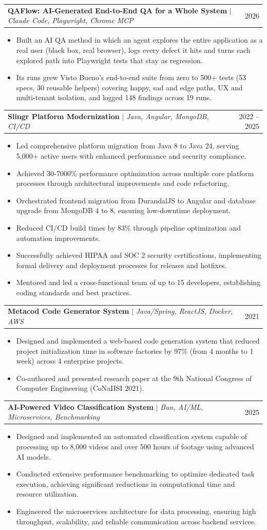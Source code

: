 \documentclass[letterpaper,11pt]{article}
\makeatletter
\newcommand{\resumeItem}[1]{
  \item\small{
    {#1 \vspace{-1pt}}
  }
}
\newcommand{\resumeProjectHeading}[2]{
    \item
    \begin{tabular*}{0.97\textwidth}{l@{\extracolsep{\fill}}r}
      \small#1 & #2 \\
    \end{tabular*}\vspace{-5pt}
}
\newcommand{\resumeItemListStart}{\begin{itemize}}
\newcommand{\resumeItemListEnd}{\end{itemize}\vspace{-3pt}}
\makeatother
\begin{document}
  \resumeProjectHeading
    {\textbf{QAFlow: AI-Generated End-to-End QA for a Whole System} $|$ \emph{Claude Code, Playwright, Chrome MCP}}{2026}
    \resumeItemListStart
      \resumeItem{Built an AI QA method in which an agent explores the entire application as a real user (black box, real browser), logs every defect it hits and turns each explored path into Playwright tests that stay as regression.}
      \resumeItem{Its runs grew Visto Bueno's end-to-end suite from zero to 500+ tests (53 specs, 30 reusable helpers) covering happy, sad and edge paths, UX and multi-tenant isolation, and logged 148 findings across 19 runs.}
    \resumeItemListEnd

  \resumeProjectHeading
    {\textbf{Slingr Platform Modernization} $|$ \emph{Java, Angular, MongoDB, CI/CD}}{2022 -- 2025}
    \resumeItemListStart
      \resumeItem{Led comprehensive platform migration from Java 8 to Java 24, serving 5,000+ active users with enhanced performance and security compliance.}
      \resumeItem{Achieved 30-7000\% performance optimization across multiple core platform processes through architectural improvements and code refactoring.}
      \resumeItem{Orchestrated frontend migration from DurandalJS to Angular and database upgrade from MongoDB 4 to 8, ensuring low-downtime deployment.}
      \resumeItem{Reduced CI/CD build times by 83\% through pipeline optimization and automation improvements.}
      \resumeItem{Successfully achieved HIPAA and SOC 2 security certifications, implementing formal delivery and deployment processes for releases and hotfixes.}
      \resumeItem{Mentored and led a cross-functional team of up to 15 developers, establishing coding standards and best practices.}
    \resumeItemListEnd

  \resumeProjectHeading
    {\textbf{Metacod Code Generator System} $|$ \emph{Java/Spring, ReactJS, Docker, AWS}}{2021}
    \resumeItemListStart
      \resumeItem{Designed and implemented a web-based code generation system that reduced project initialization time in software factories by 97\% (from 4 months to 1 week) across 4 enterprise projects.}
      \resumeItem{Co-authored and presented research paper at the 9th National Congress of Computer Engineering (CoNaIISI 2021).}
    \resumeItemListEnd

    \resumeProjectHeading
    {\textbf{AI-Powered Video Classification System} $|$ \emph{Bun, AI/ML, Microservices, Benchmarking}}{2025}
    \resumeItemListStart
      \resumeItem{Designed and implemented an automated classification system capable of processing up to 8,000 videos and over 500 hours of footage using advanced AI models.}
      \resumeItem{Conducted extensive performance benchmarking to optimize dedicated task execution, achieving significant reductions in computational time and resource utilization.}
      \resumeItem{Engineered the microservices architecture for data processing, ensuring high throughput, scalability, and reliable communication across backend services.}
    \resumeItemListEnd
\end{document}

